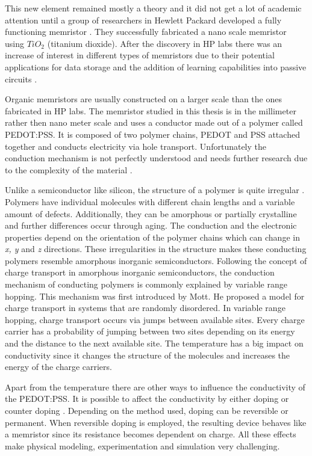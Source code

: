 \begin{doublespace}
This new element remained mostly a theory and it did not get a lot of academic attention until a group of researchers in Hewlett Packard developed a fully functioning memristor \cite{MisMem}. They successfully fabricated a nano scale memristor using $TiO_2$ (titanium dioxide). After the discovery in HP labs there was an increase of interest in different types of memristors due to their potential applications for data storage and the addition of learning capabilities into passive circuits \cite{AdaptiveMem} \cite{Synapse} \cite{CMOS}. 

Organic memristors are usually constructed on a larger scale than the ones fabricated in HP labs. The memristor studied in this thesis is in the millimeter rather then nano meter scale and uses a conductor made out of a polymer called PEDOT:PSS. It is composed of two polymer chains, PEDOT and PSS attached together and conducts electricity via hole transport. Unfortunately the conduction mechanism is not perfectly understood and needs further research due to the complexity of the material \cite{PedotBook}.

Unlike a semiconductor like silicon, the structure of a polymer is quite irregular \cite{PedotBook}. Polymers have individual molecules with different chain lengths and a variable amount of defects. Additionally, they can be amorphous or partially crystalline and further differences occur through aging. The conduction and the electronic properties depend on the orientation of the polymer chains which can change in \textit{x, y} and \textit{z} directions. These irregularities in the structure makes these conducting polymers resemble amorphous inorganic semiconductors. Following the concept of charge transport in amorphous inorganic semiconductors, the conduction mechanism of conducting polymers is commonly explained by variable range hopping. This mechanism was first introduced by Mott\cite{Mott}. He proposed a model for charge transport in systems that are randomly disordered. In variable range hopping, charge transport occurs via jumps between available sites. Every charge carrier has a probability of jumping between two sites depending on its energy and the distance to the next available site. The temperature has a big impact on conductivity since it changes the structure of the molecules and increases the energy of the charge carriers.

Apart from the temperature there are other ways to influence the conductivity of the PEDOT:PSS. It is possible to affect the conductivity by either doping or counter doping \cite{PedotDope}. Depending on the method used, doping can be reversible or permanent. When reversible doping is employed, the resulting device behaves like a memristor since its resistance becomes dependent on charge. All these effects make physical modeling, experimentation and simulation very challenging. 


\end{doublespace}
